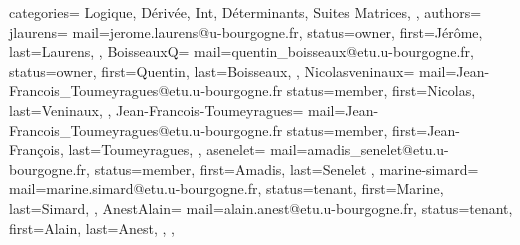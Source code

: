 {
  categories={
    Logique,
    Dérivée,
    Int,
    Déterminants,
    Suites
    Matrices,
  },
  authors={
    jlaurens={
      mail=jerome.laurens@u-bourgogne.fr,
      status=owner,
      first=Jérôme,
      last=Laurens,
    },
    BoisseauxQ={
      mail=quentin_boisseaux@etu.u-bourgogne.fr,
      status=owner,
      first=Quentin,
      last=Boisseaux,
    },
    Nicolasveninaux={
      mail=Jean-Francois_Toumeyragues@etu.u-bourgogne.fr
      status=member,
      first=Nicolas,
      last=Veninaux,
    },
    Jean-Francois-Toumeyragues={
      mail=Jean-Francois_Toumeyragues@etu.u-bourgogne.fr
      status=member,
      first=Jean-François,
      last=Toumeyragues,
    },
    asenelet={
      mail=amadis_senelet@etu.u-bourgogne.fr, 
      status=member,
      first=Amadis,
      last=Senelet
    },
    marine-simard={
      mail=marine.simard@etu.u-bourgogne.fr,
      status=tenant,
      first=Marine,
      last=Simard,
    },  
    AnestAlain={
      mail=alain.anest@etu.u-bourgogne.fr,
      status=tenant,
      first=Alain,
      last=Anest,
    },
  },
}
